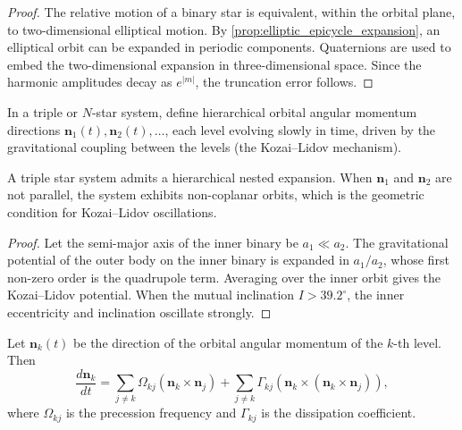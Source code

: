 \begin{proof}
The relative motion of a binary star is equivalent, within the orbital plane, to two-dimensional elliptical motion. By \cref{prop:elliptic_epicycle_expansion}, an elliptical orbit can be expanded in periodic components. Quaternions are used to embed the two-dimensional expansion in three-dimensional space. Since the harmonic amplitudes decay as \(e^{|m|}\), the truncation error follows.
\end{proof}

\begin{definition}\label{def:multiple_star_dynamic_axes}
In a triple or \(N\)-star system, define hierarchical orbital angular momentum directions \(\mathbf n_1(t),\mathbf n_2(t),\dots\), each level evolving slowly in time, driven by the gravitational coupling between the levels (the Kozai--Lidov mechanism).
\end{definition}

\begin{proposition}\label{prop:multiple_star_episphere}
A triple star system admits a hierarchical nested expansion. When \(\mathbf n_1\) and \(\mathbf n_2\) are not parallel, the system exhibits non-coplanar orbits, which is the geometric condition for Kozai--Lidov oscillations.
\end{proposition}

\begin{proof}
Let the semi-major axis of the inner binary be \(a_1\ll a_2\). The gravitational potential of the outer body on the inner binary is expanded in \(a_1/a_2\), whose first non-zero order is the quadrupole term. Averaging over the inner orbit gives the Kozai--Lidov potential. When the mutual inclination \(I>39.2^\circ\), the inner eccentricity and inclination oscillate strongly.
\end{proof}

\begin{theorem}\label{thm:dynamic_axis_evolution}
Let \(\mathbf n_k(t)\) be the direction of the orbital angular momentum of the \(k\)-th level. Then
\[
\frac{d\mathbf n_k}{dt}=\sum_{j\neq k}\Omega_{kj}(\mathbf n_k\times\mathbf n_j)
+\sum_{j\neq k}\Gamma_{kj}(\mathbf n_k\times(\mathbf n_k\times\mathbf n_j)),
\]
where \(\Omega_{kj}\) is the precession frequency and \(\Gamma_{kj}\) is the dissipation coefficient.
\end{theorem}

